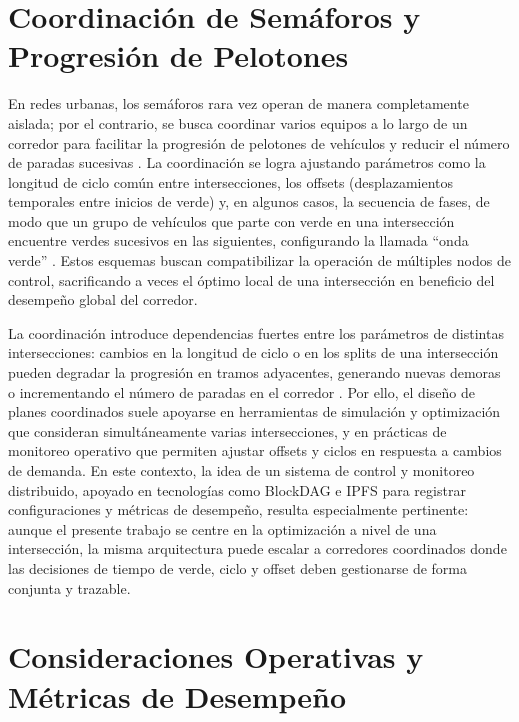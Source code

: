 

\section{Coordinación de Semáforos y Progresión de Pelotones}
\label{subsec:coordinacion_semaforos}

En redes urbanas, los semáforos rara vez operan de manera completamente aislada; por el contrario, se busca coordinar varios equipos a lo largo de un corredor para facilitar la progresión de pelotones de vehículos y reducir el número de paradas sucesivas \cite{garber2019traffic,roess2019traffic}. La coordinación se logra ajustando parámetros como la longitud de ciclo común entre intersecciones, los offsets (desplazamientos temporales entre inicios de verde) y, en algunos casos, la secuencia de fases, de modo que un grupo de vehículos que parte con verde en una intersección encuentre verdes sucesivos en las siguientes, configurando la llamada ``onda verde'' \cite{fhwa2008signal,erdogan2013coordination}. Estos esquemas buscan compatibilizar la operación de múltiples nodos de control, sacrificando a veces el óptimo local de una intersección en beneficio del desempeño global del corredor.

La coordinación introduce dependencias fuertes entre los parámetros de distintas intersecciones: cambios en la longitud de ciclo o en los splits de una intersección pueden degradar la progresión en tramos adyacentes, generando nuevas demoras o incrementando el número de paradas en el corredor \cite{erdogan2013coordination,roess2019traffic}. Por ello, el diseño de planes coordinados suele apoyarse en herramientas de simulación y optimización que consideran simultáneamente varias intersecciones, y en prácticas de monitoreo operativo que permiten ajustar offsets y ciclos en respuesta a cambios de demanda. En este contexto, la idea de un sistema de control y monitoreo distribuido, apoyado en tecnologías como BlockDAG e IPFS para registrar configuraciones y métricas de desempeño, resulta especialmente pertinente: aunque el presente trabajo se centre en la optimización a nivel de una intersección, la misma arquitectura puede escalar a corredores coordinados donde las decisiones de tiempo de verde, ciclo y offset deben gestionarse de forma conjunta y trazable.




\section{Consideraciones Operativas y Métricas de Desempeño}
\label{subsec:metricas_desempeno}

